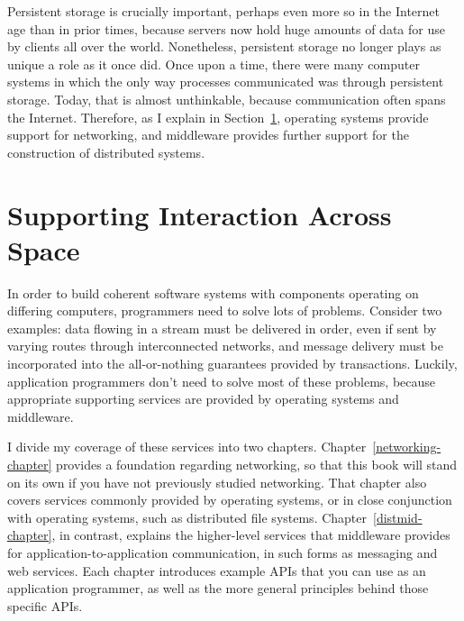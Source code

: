 Persistent storage is crucially important, perhaps even more so in the
Internet age than in prior times, because servers now hold huge
amounts of data for use by clients all over the world.  Nonetheless,
persistent storage no longer plays as unique a role as it once did.
Once upon a time, there were many computer systems in which the only
way processes communicated was through persistent storage.  Today,
that is almost unthinkable, because communication often spans the
Internet.  Therefore, as I explain in
Section~\ref{networking-section}, operating systems provide support
for networking, and middleware provides further support for the
construction of distributed systems.

\section{Supporting Interaction Across Space}\label{networking-section}

In order to build coherent software systems with components operating
on differing computers, programmers need to solve lots of problems.
Consider two examples: data flowing in a stream must be delivered in
order, even if sent by varying routes through interconnected networks,
and message delivery must be incorporated into the all-or-nothing
guarantees provided by transactions.  Luckily, application programmers
don't need to solve most of these problems, because appropriate
supporting services are provided by operating systems and middleware.

I divide my coverage of these services into two chapters.
Chapter~\ref{networking-chapter} provides a foundation regarding
networking, so that this book will stand on its own if you have not
previously studied networking.  That chapter also covers services
commonly provided by operating systems, or in close conjunction with
operating systems, such as distributed file systems.
Chapter~\ref{distmid-chapter}, in contrast, explains the higher-level
services that middleware provides for application-to-application
communication, in such forms as messaging and web services.  Each
chapter introduces example APIs that you can use as an application
programmer, as well as the more general principles behind those
specific APIs.

